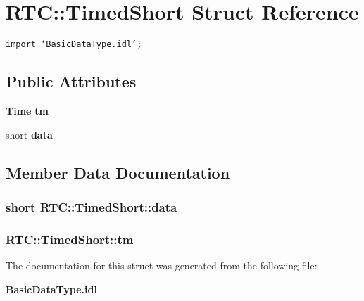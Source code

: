 \section{RTC::Timed\-Short Struct Reference}
\label{structRTC_1_1TimedShort}
{\tt import \char`\"{}Basic\-Data\-Type.idl\char`\"{};}

\subsection*{Public Attributes}
\begin{CompactItemize}
\item 
{\bf Time} {\bf tm}
\item 
short {\bf data}
\end{CompactItemize}


\subsection{Member Data Documentation}
\subsubsection{\setlength{\rightskip}{0pt plus 5cm}short {\bf RTC::Timed\-Short::data}}\label{structRTC_1_1TimedShort_RTC_1_1TimedShorto1}


\subsubsection{ {\bf RTC::Timed\-Short::tm}}\label{structRTC_1_1TimedShort_RTC_1_1TimedShorto0}




The documentation for this struct was generated from the following file:\begin{CompactItemize}
\item 
{\bf Basic\-Data\-Type.idl}\end{CompactItemize}

